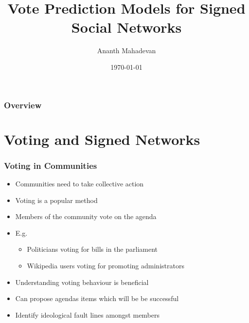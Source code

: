 \documentclass{beamer}
\title[Signed Vote Prediction]{Vote Prediction Models for Signed Social Networks}
\author{Ananth Mahadevan}
\institute{Aalto University}
\date{\today}
\begin{document}
\begin{frame}
    \titlepage
\end{frame}

\begin{frame}
    \frametitle{Overview}
    \tableofcontents
\end{frame}


\section{Voting and Signed Networks}

\begin{frame}
    \frametitle{Voting in Communities}
    \begin{itemize}
        \item Communities need to take collective action 
        \item Voting is a popular method 
        \item Members of the community vote on the agenda
        \item E.g.
        \begin{itemize}
            \item Politicians voting for bills in the parliament
            \item Wikipedia users voting for promoting administrators 
        \end{itemize}
        \item Understanding voting behaviour is beneficial
        \item Can propose agendas items which will be be successful 
        \item Identify ideological fault lines amongst members
    \end{itemize}
    
\end{frame}
\end{document}
